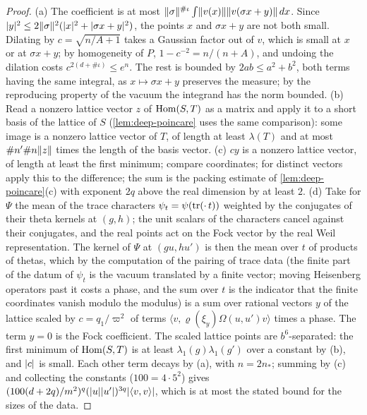 \begin{proof}
(a) The coefficient is at most $\lVert \sigma\rVert^{\#\iota}\int\lVert v(x)\rVert\lVert v(\sigma x+y)\rVert\,dx$. Since $\lvert y\rvert^2\le2\lVert \sigma\rVert^2(\lvert x\rvert^2+\lvert \sigma x+y\rvert^2)$, the points $x$ and $\sigma x+y$ are not both small. Dilating by $c=\sqrt{n/A+1}$ takes a Gaussian factor out
of $v$, which is small at $x$ or at $\sigma x+y$; by homogeneity of $P$, $1-c^{-2}=n/(n+A)$, and undoing the dilation costs $c^{2(d+\#\iota)}\le e^n$. The rest is bounded by $2ab\le a^2+b^2$, both terms having the same integral, as $x\mapsto\sigma x+y$
preserves the measure; by the reproducing property of the vacuum the integrand has the norm bounded. (b) Read a nonzero lattice vector $z$ of $\operatorname{Hom}(S,T)$ as a matrix and apply it to a short basis of the lattice of $S$ (\cref{lem:deep-poincare}
uses the same comparison): some image is a nonzero lattice vector of $T$, of length at least $\lambda(T)$ and at most $\#n'\#n\lVert z\rVert$ times the length of the basis vector. (c) $cy$ is a nonzero lattice vector, of length at least the first minimum;
compare coordinates; for distinct vectors apply this to the difference; the sum is the packing estimate of \cref{lem:deep-poincare}(c) with exponent $2q$ above the real dimension by at least $2$. (d) Take for $\Psi$ the mean of the trace characters
$\psi_t=\psi(\operatorname{tr}(\cdot\,t))$ weighted by the conjugates of their theta kernels at $(g,h)$; the unit scalars of the characters cancel against their conjugates, and the real points act on the Fock vector by the real Weil representation. The
kernel of $\Psi$ at $(gu,hu')$ is then the mean over $t$ of products of thetas, which by the computation of the pairing of trace data (the finite part of the datum of $\psi_t$ is the vacuum translated by a finite vector; moving
Heisenberg operators past it costs a phase, and the sum over $t$ is the indicator that the finite coordinates vanish modulo the modulus) is a sum over rational vectors $y$ of the lattice scaled by $c=q_1/\varpi^2$ of terms
$\langle v,\varrho(\xi_y)\Omega(u,u')v\rangle$ times a phase. The term $y=0$ is the Fock coefficient. The scaled lattice points are $b^6$-separated: the first minimum of $\operatorname{Hom}(S,T)$ is at least $\lambda_1(g)\lambda_1(g')$ over a constant by (b), and $\lvert c\rvert$
is small. Each other term decays by (a), with $n=2n_*$; summing by (c) and collecting the constants ($100=4\cdot5^2$) gives $(100(d+2q)/m^2)^q(\lvert u\rvert\lvert u'\rvert)^{3q}\lvert \langle v,v\rangle\rvert$, which is at most the stated bound for the sizes of the data.
\end{proof}

